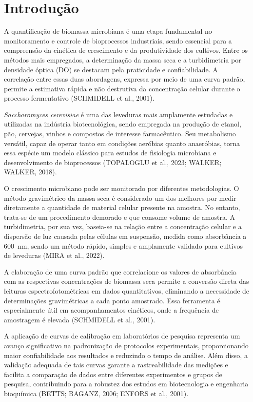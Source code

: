 
\section{Introdução}

A quantificação de biomassa microbiana é uma etapa fundamental no monitoramento e controle de bioprocessos industriais, sendo essencial para a compreensão da cinética de crescimento e da produtividade dos cultivos. Entre os métodos mais empregados, a determinação da massa seca e a turbidimetria por densidade óptica (DO) se destacam pela praticidade e confiabilidade. A correlação entre essas duas abordagens, expressa por meio de uma curva padrão, permite a estimativa rápida e não destrutiva da concentração celular durante o processo fermentativo (SCHMIDELL et al., 2001).

\textit{Saccharomyces cerevisiae} é uma das leveduras mais amplamente estudadas e utilizadas na indústria biotecnológica, sendo empregada na produção de etanol, pão, cervejas, vinhos e compostos de interesse farmacêutico. Seu metabolismo versátil, capaz de operar tanto em condições aeróbias quanto anaeróbias, torna essa espécie um modelo clássico para estudos de fisiologia microbiana e desenvolvimento de bioprocessos (TOPALOGLU et al., 2023; WALKER; WALKER, 2018).

O crescimento microbiano pode ser monitorado por diferentes metodologias. O método gravimétrico da massa seca é considerado um dos melhores por medir diretamente a quantidade de material celular presente na amostra. No entanto, trata-se de um procedimento demorado e que consome volume de amostra. A turbidimetria, por sua vez, baseia-se na relação entre a concentração celular e a dispersão de luz causada pelas células em suspensão, medida como absorbância a 600~nm, sendo um método rápido, simples e amplamente validado para cultivos de leveduras (MIRA et al., 2022).

A elaboração de uma curva padrão que correlacione os valores de absorbância com as respectivas concentrações de biomassa seca permite a conversão direta das leituras espectrofotométricas em dados quantitativos, eliminando a necessidade de determinações gravimétricas a cada ponto amostrado. Essa ferramenta é especialmente útil em acompanhamentos cinéticos, onde a frequência de amostragem é elevada (SCHMIDELL et al., 2001).

A aplicação de curvas de calibração em laboratórios de pesquisa representa um avanço significativo na padronização de protocolos experimentais, proporcionando maior confiabilidade aos resultados e reduzindo o tempo de análise. Além disso, a validação adequada de tais curvas garante a rastreabilidade das medições e facilita a comparação de dados entre diferentes experimentos e grupos de pesquisa, contribuindo para a robustez dos estudos em biotecnologia e engenharia bioquímica (BETTS; BAGANZ, 2006; ENFORS et al., 2001).